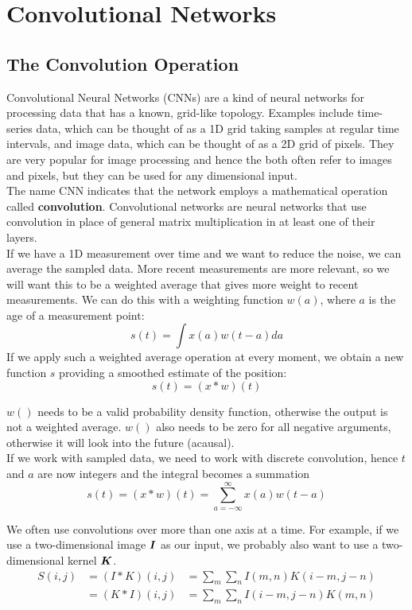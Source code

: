 \section{Convolutional Networks}
\begin{multicols}{2}
	\subsection{The Convolution Operation}
	Convolutional Neural Networks (CNNs) are a kind of neural networks for processing data that has a known, grid-like topology.
	Examples include time-series data, which can be thought of as a 1D grid taking samples at regular time intervals, and image data, which can be thought of as a 2D grid of pixels.
	They are very popular for image processing and hence the both often refer to images and pixels, but they can be used for any dimensional input.\\

	The name CNN indicates that the network employs a mathematical operation called \textbf{convolution}.
	Convolutional networks are neural networks that use convolution in place of general matrix multiplication in at least one of their layers.\\

	If we have a 1D measurement over time and we want to reduce the noise, we can average the sampled data.
	More recent measurements are more relevant, so we will want this to be a weighted average that gives more weight to recent measurements.
	We can do this with a weighting function $w(a)$, where $a$ is the age of a measurement point:
	\[ s(t) = \int x(a)w(t-a)da \]
	If we apply such a weighted average operation at every moment, we obtain a new function $s$ providing a smoothed estimate of the position:
	\[ s(t) = (x\ast w)(t) \]

	$w()$ needs to be a valid probability density function, otherwise the output is not a weighted average.
	$w()$ also needs to be zero for all negative arguments, otherwise it will look into the future (acausal).\\
	If we work with sampled data, we need to work with discrete convolution, hence $t$ and $a$ are now integers and the integral becomes a summation
	\[ s(t) = (x\ast w)(t) = \sum_{a=-\infty}^{\infty} x(a)w(t-a) \]

	We often use convolutions over more than one axis at a time.
	For example, if we use a two-dimensional image ${\bm{I}}$ as our input, we probably also want to use a two-dimensional kernel ${\bm{K}}$.
	\begin{align*}
		S(i,j)
		&= (I\ast K)(i,j) &= \sum_m\sum_n I(m,n) K(i-m,j-n)\\
		&= (K\ast I)(i,j) &= \sum_m\sum_n I(i-m,j-n) K(m,n)
	\end{align*}


\end{multicols}
